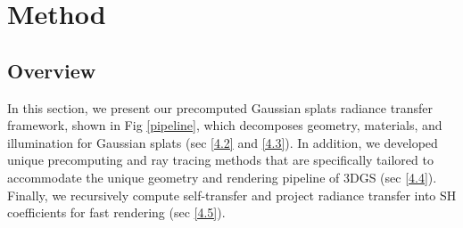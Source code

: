 



\section{Method}
\label{sec:method}
\subsection{Overview}
In this section, we present our precomputed Gaussian splats radiance transfer framework, shown in Fig \ref{pipeline}, which decomposes geometry, materials, and illumination
for Gaussian splats (sec \ref{4.2} and \ref{4.3}). In addition, we developed unique precomputing and ray tracing methods that are specifically tailored to accommodate the unique geometry and rendering pipeline of 3DGS (sec \ref{4.4}). Finally, we recursively compute self-transfer and project radiance transfer into SH coefficients for fast rendering (sec \ref{4.5}).







